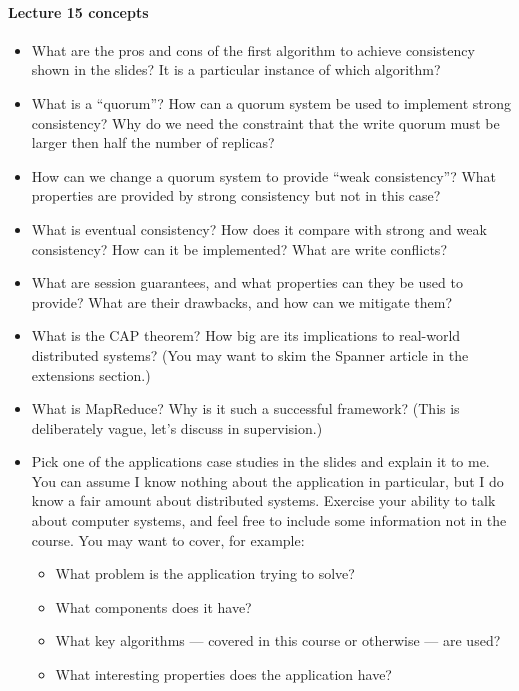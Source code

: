 \documentclass[12pt,a4paper,oneside,openright]{report}
\newcommand{\question}[2]{\paragraph{#1} #2}
\begin{document}
\question{Lecture 15 concepts}{
  \begin{itemize}
  \item What are the pros and cons of the first algorithm to achieve
    consistency shown in the slides? It is a particular instance of
    which algorithm?
  \item What is a ``quorum''? How can a quorum system be used to
    implement strong consistency? Why do we need the constraint that
    the write quorum must be larger then half the number of replicas?
  \item How can we change a quorum system to provide ``weak
    consistency''? What properties are provided by strong consistency
    but not in this case?
  \item What is eventual consistency? How does it compare with strong
    and weak consistency? How can it be implemented? What are write
    conflicts?
  \item What are session guarantees, and what properties can they be
    used to provide? What are their drawbacks, and how can we mitigate
    them?
  \item What is the CAP theorem? How big are its implications to
    real-world distributed systems? (You may want to skim the Spanner
    article in the extensions section.)
  \item What is MapReduce? Why is it such a successful framework?
    (This is deliberately vague, let's discuss in supervision.)
  \item Pick one of the applications case studies in the slides and
    explain it to me. You can assume I know nothing about the
    application in particular, but I do know a fair amount about
    distributed systems. Exercise your ability to talk about computer
    systems, and feel free to include some information not in the
    course. You may want to cover, for example:
    \begin{itemize}
    \item What problem is the application trying to solve?
    \item What components does it have?
    \item What key algorithms --- covered in this course or otherwise
      --- are used?
    \item What interesting properties does the application have?
    \end{itemize}
  \end{itemize}
}
\end{document}
